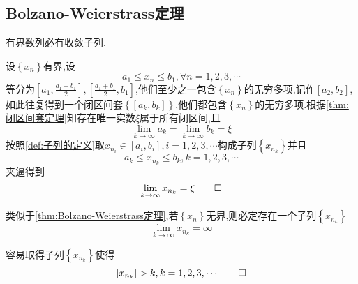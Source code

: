 \subsection{Bolzano-Weierstrass定理}
\begin{formal}
    \begin{theorem}\label{thm:Bolzano-Weierstrass定理}
        有界数列必有收敛子列.
    \end{theorem}\begin{Proof}
        设$\left\{x_n\right\}$有界,设\[
        a_1\leqslant x_n\leqslant b_1,\forall n=1,2,3,\cdots
        \]等分为$\displaystyle\left[a_1,\frac{a_1+b_1}{2}\right],\left[\frac{a_1+b_1}{2},b_1\right]$,他们至少之一包含$\left\{x_n\right\}$的无穷多项,记作$\left[a_2,b_2\right]$,如此往复得到一个闭区间套$\left\{\left[a_k,b_k\right]\right\}$,他们都包含$\left\{x_n\right\}$的无穷多项.根据\cref{thm:闭区间套定理}知存在唯一实数$\xi$属于所有闭区间,且\[
        \lim_{k\to\infty}a_k=\lim_{k\to\infty}b_k=\xi
        \]按照\cref{def:子列的定义}取$x_{n_i}\in\left[a_i,b_i\right],i=1,2,3,\cdots$构成子列$\left\{x_{n_k}\right\}$并且\[
        a_k\leqslant x_{n_k}\leqslant b_k,k=1,2,3,\cdots
        \]夹逼得到\[
        \lim_{k\to\infty}x_{n_k}=\xi\qedhere
        \]
    \end{Proof}
\end{formal}
\begin{formal}
    \begin{theorem}[无界情形]\label{thm:无界情形}
        类似于\cref{thm:Bolzano-Weierstrass定理},若$\left\{x_n\right\}$无界,则必定存在一个子列$\left\{x_{n_k}\right\}$\[
        \lim_{k\to\infty}x_{n_k}=\infty
        \]
    \end{theorem}
    \begin{Proof}
        容易取得子列$\left\{x_{n_k}\right\}$使得\[
        \left|x_{n_k}\right|>k,k=1,2,3,\cdots\qedhere
        \]
    \end{Proof}
\end{formal}
